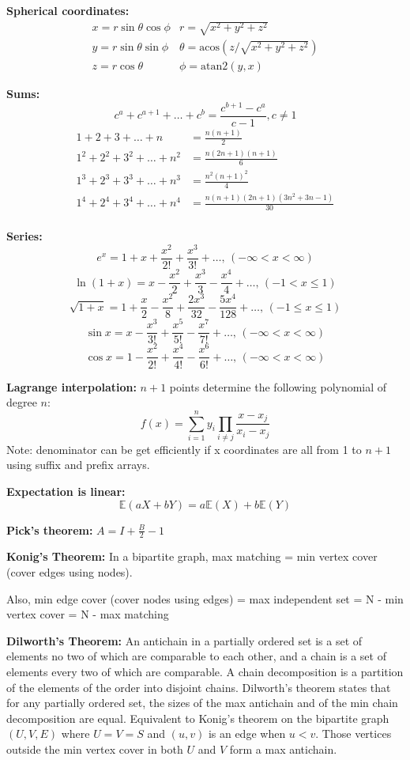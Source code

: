 \noindent
\textbf{Spherical coordinates:}
\[\begin{array}{cc}
x = r\sin\theta\cos\phi & r = \sqrt{x^2+y^2+z^2}\\
y = r\sin\theta\sin\phi & \theta = \textrm{acos}(z/\sqrt{x^2+y^2+z^2})\\
z = r\cos\theta & \phi = \textrm{atan2}(y,x)
\end{array}\]

\noindent
\textbf{Sums:}
\[ c^a + c^{a+1} + \dots + c^{b} = \frac{c^{b+1} - c^a}{c-1}, c \neq 1 \]
\begin{align*}
	1 + 2 + 3 + \dots + n &= \frac{n(n+1)}{2} \\
	1^2 + 2^2 + 3^2 + \dots + n^2 &= \frac{n(2n+1)(n+1)}{6} \\
	1^3 + 2^3 + 3^3 + \dots + n^3 &= \frac{n^2(n+1)^2}{4} \\
	1^4 + 2^4 + 3^4 + \dots + n^4 &= \frac{n(n+1)(2n+1)(3n^2 + 3n - 1)}{30} \\
\end{align*}

\noindent
\textbf{Series:}
$$e^x = 1+x+\frac{x^2}{2!}+\frac{x^3}{3!}+\dots,\,(-\infty<x<\infty)$$
$$\ln(1+x) = x-\frac{x^2}{2}+\frac{x^3}{3}-\frac{x^4}{4}+\dots,\,(-1<x\leq1)$$
$$\sqrt{1+x} = 1+\frac{x}{2}-\frac{x^2}{8}+\frac{2x^3}{32}-\frac{5x^4}{128}+\dots,\,(-1\leq x\leq1)$$
$$\sin x = x-\frac{x^3}{3!}+\frac{x^5}{5!}-\frac{x^7}{7!}+\dots,\,(-\infty<x<\infty)$$
$$\cos x = 1-\frac{x^2}{2!}+\frac{x^4}{4!}-\frac{x^6}{6!}+\dots,\,(-\infty<x<\infty)$$

\noindent
\textbf{Lagrange interpolation:} $n+1$ points determine the following polynomial of degree $n$:
\[ f(x)=\sum\limits_{i=1}^n y_i\prod _{i\neq j}\dfrac{x-x_j}{x_i-x_j} \]
Note: denominator can be get efficiently if x coordinates are all from 1 to $n+1$ using suffix and prefix arrays.

\noindent
\textbf{Expectation is linear:} \[\mathbb{E}(aX+bY) = a\mathbb{E}(X)+b\mathbb{E}(Y)\]

\noindent
\textbf{Pick's theorem:} $A=I+\frac{B}{2}-1$

\noindent
\textbf{Konig's Theorem:} In a bipartite graph, max matching = min vertex cover (cover edges using nodes).

\noindent
Also, min edge cover (cover nodes using edges) = max independent set = N - min vertex cover = N - max matching

\noindent
\textbf{Dilworth's Theorem:} An antichain in a partially ordered set is a set of elements no two of which are comparable to each other, and a chain is a set of elements every two of which are comparable. A chain decomposition is a partition of the elements of the order into disjoint chains. Dilworth's theorem states that for any partially ordered set, the sizes of the max antichain and of the min chain decomposition are equal. Equivalent to Konig's theorem on the bipartite graph $(U,V,E)$ where $U=V=S$ and $(u,v)$ is an edge when $u<v$. Those vertices outside the min vertex cover in both $U$ and $V$ form a max antichain.
